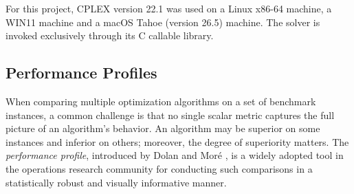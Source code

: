 \documentclass{article}
\begin{document}

For this project, CPLEX version 22.1 was used on a Linux x86-64 machine, a WIN11 machine and a macOS Tahoe (version 26.5) machine. The solver is invoked exclusively through its C callable library.

\subsection{Performance Profiles}

When comparing multiple optimization algorithms on a set of benchmark instances, a common
challenge is that no single scalar metric captures the full picture of an algorithm's
behavior. An algorithm may be superior on some instances and inferior on others; moreover,
the degree of superiority matters. The \textit{performance profile}, introduced by Dolan and
Moré \cite{dolan2002benchmarking}, is a widely adopted tool in the operations research
community for conducting such comparisons in a statistically robust and visually informative
manner.
\end{document}
